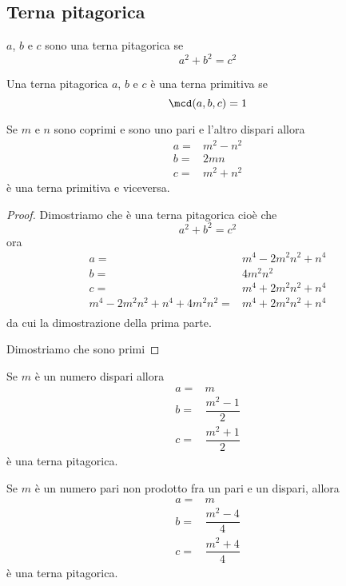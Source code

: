 \subsection{Terna pitagorica}
\begin{definizione}
$a$, $b$ e $c$ sono una terna pitagorica se \[a^2+b^2=c^2\]
\end{definizione}
\begin{definizione}
Una terna pitagorica  $a$, $b$ e $c$ è una terna primitiva se
\[\mcd(a,b,c)=1\]
\end{definizione}
\begin{teorema}
	Se $m$ e $n$ sono coprimi e sono uno pari e l'altro dispari allora
	\begin{align*}
	a=&m^2-n^2\\
	b=&2mn\\
	c=&m^2+n^2
	\end{align*}
	è una terna primitiva e viceversa. 
\end{teorema}
\begin{proof}
	Dimostriamo che è una terna pitagorica cioè che \[a^2+b^2=c^2\]
	ora 
		\begin{align*}
	a=&m^4-2m^2n^2+n^4\\
	b=&4m^2n^2\\
	c=&m^4+2m^2n^2+n^4\\
	m^4-2m^2n^2+n^4+4m^2n^2=&m^4+2m^2n^2+n^4\\
	\end{align*}
	da cui la dimostrazione della prima parte. 
	
	Dimostriamo che sono primi
\end{proof}
\begin{teorema}
	Se $m$ è un numero dispari allora
		\begin{align*}
	a=&m\\
	b=&\dfrac{m^2-1}{2} \\
	c=&\dfrac{m^2+1}{2}
	\end{align*}
	è una terna pitagorica.\par
		Se $m$ è un numero pari non prodotto fra un pari e un dispari, allora
	\begin{align*}
	a=&m\\
	b=&\dfrac{m^2-4}{4} \\
	c=&\dfrac{m^2+4}{4}
	\end{align*}
		è una terna pitagorica.
\end{teorema}